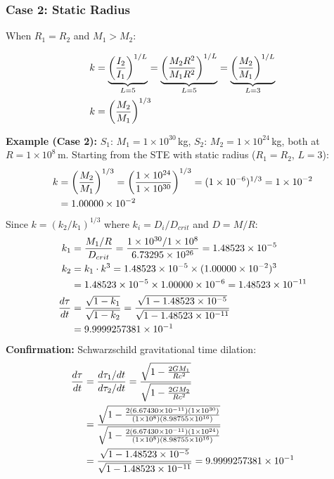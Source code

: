 \subsubsection*{Case 2: Static Radius}

When $R_1 = R_2$ and $M_1 > M_2$:

\begin{align}
k &= \underbrace{\left(\frac{I_2}{I_1}\right)^{1/L}}_{L=5} = \underbrace{\left(\frac{M_2 R^2}{M_1 R^2}\right)^{1/L}}_{L=5} = \underbrace{\left(\frac{M_2}{M_1}\right)^{1/L}}_{L=3} \notag \\
k &= \left(\frac{M_2}{M_1}\right)^{1/3}
\end{align}

\begin{mdframed}
\textbf{Example (Case 2):} $S_1$: $M_1 = 1 \times 10^{30}$\,kg, $S_2$: $M_2 = 1 \times 10^{24}$\,kg, both at $R = 1 \times 10^{8}$\,m. Starting from the STE with static radius ($R_1 = R_2$, $L = 3$):
\begin{align}
k &= \left(\frac{M_2}{M_1}\right)^{1/3}
= \left(\frac{1 \times 10^{24}}{1 \times 10^{30}}\right)^{1/3}
= (1 \times 10^{-6})^{1/3}
= 1 \times 10^{-2} \notag \\
&= 1.00000 \times 10^{-2} \notag
\end{align}
Since $k = (k_2/k_1)^{1/3}$ where $k_i = D_i/D_{crit}$ and $D = M/R$:
\begin{align}
k_1 &= \frac{M_1/R}{D_{crit}}
= \frac{1 \times 10^{30}/1 \times 10^{8}}{6.73295 \times 10^{26}}
= 1.48523 \times 10^{-5} \notag \\
k_2 &= k_1 \cdot k^3
= 1.48523 \times 10^{-5} \times (1.00000 \times 10^{-2})^3 \notag \\
&= 1.48523 \times 10^{-5} \times 1.00000 \times 10^{-6}
= 1.48523 \times 10^{-11} \notag \\
\frac{d\tau}{dt}
&= \frac{\sqrt{1 - k_1}}{\sqrt{1 - k_2}}
= \frac{\sqrt{1 - 1.48523 \times 10^{-5}}}{\sqrt{1 - 1.48523 \times 10^{-11}}} \notag \\
&= 9.9999257381 \times 10^{-1} \notag
\end{align}
\textbf{Confirmation:} Schwarzschild gravitational time dilation:
\begin{align}
\frac{d\tau}{dt}
&= \frac{d\tau_1 / dt}{d\tau_2 / dt}
= \frac{\sqrt{1 - \frac{2GM_1}{Rc^2}}}{\sqrt{1 - \frac{2GM_2}{Rc^2}}} \notag \\
&= \frac{\sqrt{1 - \frac{2(6.67430 \times 10^{-11})(1 \times 10^{30})}{(1 \times 10^{8})(8.98755 \times 10^{16})}}}{\sqrt{1 - \frac{2(6.67430 \times 10^{-11})(1 \times 10^{24})}{(1 \times 10^{8})(8.98755 \times 10^{16})}}} \notag \\
&= \frac{\sqrt{1 - 1.48523 \times 10^{-5}}}{\sqrt{1 - 1.48523 \times 10^{-11}}}
= 9.9999257381 \times 10^{-1} \notag
\end{align}
\end{mdframed}

